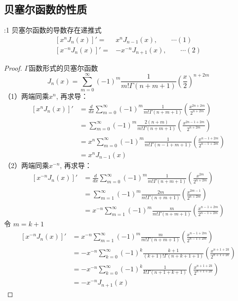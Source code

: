 \subsection{贝塞尔函数的性质}
\begin{proposition}:1 贝塞尔函数的导数存在递推式	
	\begin{equation*}
		\begin{split}
			\left[x^{n} J_{n}(x)\right]'= &x^{n} J_{n-1}(x),\qquad \cdots (1) \\
			\left[x^{-n} J_{n}(x)\right]'=& -x^{-n} J_{n+1}(x) ,\qquad \cdots (2) 
		\end{split}
	\end{equation*}
\end{proposition}
\begin{proof}$\Gamma$函数形式的贝塞尔函数
	\begin{equation*}
		J_n(x) = \sum\limits_{m=0}^{\infty} (-1)^m  \frac{1}{m! \Gamma(n+m+1) } (\frac{x}{2})^{n+2m} 
	\end{equation*}	 
	（1）两端同乘$x^n$, 再求导：
	\begin{equation*}
		\begin{split}
			[x^n J_n(x)]' &= \frac{d}{dx}\sum\limits_{m=0}^{\infty} (-1)^m  
			\frac{1}{m! \Gamma(n+m+1) } (\frac{x^{2n+2m}}{2^{n+2m}})\\
			&=\sum\limits_{m=0}^{\infty} (-1)^m  
			\frac{2(n+m)}{m! \Gamma(n+m+1) } (\frac{x^{2n-1+2m}}{2^{n+2m}})\\
			&=x^n\sum\limits_{m=0}^{\infty} (-1)^m  
			\frac{1}{m! \Gamma(n-1+m+1) } (\frac{x^{n-1+2m}}{2^{n-1+2m}})\\ 
			&=x^n J_{n-1}(x) 
		\end{split}
		\end{equation*}	 
		（2）两端同乘$x ^{-n} $, 再求导：
		\begin{equation*}
			\begin{split}
				[x ^{-n}  J_n(x)]' &= \frac{d}{dx}\sum\limits_{m=0}^{\infty} (-1)^m  
				\frac{1}{m! \Gamma(n+m+1) } (\frac{x^{2m}}{2^{n+2m}})\\
				&=\sum\limits_{m=1}^{\infty} (-1)^m  
				\frac{2m}{m! \Gamma(n+m+1) } (\frac{x^{2m-1}}{2^{n+2m}})\\
				&=x ^{-n} \sum\limits_{m=1}^{\infty} (-1)^m  
				\frac{m}{m! \Gamma(n+m+1) } (\frac{x^{n-1+2m}}{2^{n-1+2m}})
			\end{split}
			\end{equation*}	 
	令  $ m = k+1  $
	\begin{equation*}
		\begin{split}
			[x ^{-n}  J_n(x)]' 
			&=x ^{-n} \sum\limits_{m=1}^{\infty} (-1)^m  
			\frac{m}{m! \Gamma(n+m+1) } (\frac{x^{n-1+2m}}{2^{n-1+2m}})\\ 
			&=-x ^{-n} \sum\limits_{k=0}^{\infty} (-1)^k  
			\frac{k+1}{(k+1)! \Gamma(n+k+1+1) } (\frac{x^{n+1+2k}}{2^{n+1+2k}})\\
			&=-x ^{-n} \sum\limits_{k=0}^{\infty} (-1)^k  
			\frac{1}{k! \Gamma(n+1+k+1) } (\frac{x^{n+1+2k}}{2^{n+1+2k}})\\
			&=-x ^{-n}  J_{n+1}(x) 
		\end{split}
		\end{equation*}
\end{proof}
